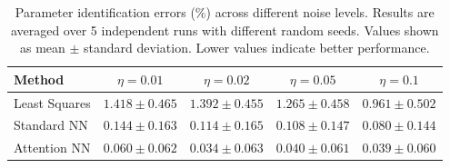 \begin{table}[t]
\small\sf\centering
\caption{Parameter identification errors (\%) across different noise levels. Results are averaged over 5 independent runs with different random seeds. Values shown as mean $\pm$ standard deviation. Lower values indicate better performance.}
\label{tab:results}
\begin{tabular}{lcccc}
\toprule
\textbf{Method} & $\eta = 0.01$ & $\eta = 0.02$ & $\eta = 0.05$ & $\eta = 0.1$ \\
\midrule
Least Squares & $1.418 \pm 0.465$ & $1.392 \pm 0.455$ & $1.265 \pm 0.458$ & $0.961 \pm 0.502$ \\
Standard NN & $0.144 \pm 0.163$ & $0.114 \pm 0.165$ & $0.108 \pm 0.147$ & $0.080 \pm 0.144$ \\
Attention NN & $0.060 \pm 0.062$ & $0.034 \pm 0.063$ & $0.040 \pm 0.061$ & $0.039 \pm 0.060$ \\
\bottomrule
\end{tabular}
\end{table}
